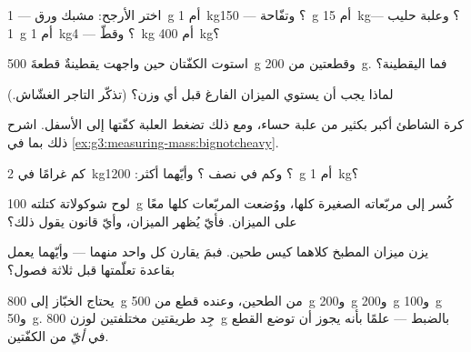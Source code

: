\begin{exercise}[$\star$]\label{exo:g3:measuring-mass:2}
اختر  الأرجح: مشبك ورق --- \qty{1}{g} أم \qty{1}{kg}؟
وتفّاحة --- \qty{150}{g} أم \qty{15}{kg}؟ وعلبة حليب ---
\qty{1}{g} أم \qty{1}{kg}؟ وقطّ --- \qty{4}{kg} أم \qty{400}{kg}؟
\end{exercise}

\begin{exercise}[$\star$]\label{exo:g3:measuring-mass:3}
استوت الكفّتان حين واجهت يقطينةٌ قطعةَ \qty{500}{g} وقطعتين من
\qty{200}{g}. فما  اليقطينة؟
\end{exercise}

\begin{exercise}[$\star$]\label{exo:g3:measuring-mass:4}
لماذا يجب أن يستوي الميزان الفارغ قبل أي وزن؟ (تذكّر التاجر
الغشّاش.)
\end{exercise}

\begin{exercise}[$\star$]\label{exo:g3:measuring-mass:5}
كرة الشاطئ أكبر بكثير من علبة حساء، ومع ذلك تضغط العلبة كفّتها
إلى الأسفل. اشرح ذلك بما في
\cref{ex:g3:measuring-mass:bignotcheavy}.
\end{exercise}

\begin{exercise}[$\star$]\label{exo:g3:measuring-mass:6}
كم غرامًا في \qty{2}{kg}؟ وكم في نصف ؟ وأيّهما أكثر:
\qty{1200}{g} أم \qty{1}{kg}؟
\end{exercise}

\begin{exercise}[$\star$]\label{exo:g3:measuring-mass:7}
لوح شوكولاتة كتلته \qty{100}{g} كُسر إلى مربّعاته الصغيرة كلها،
ووُضعت المربّعات كلها معًا على الميزان. فأيّ  يُظهر الميزان،
وأيّ قانون يقول ذلك؟
\end{exercise}

\begin{exercise}[$\star$]\label{exo:g3:measuring-mass:8}
يزن ميزان المطبخ  كلاهما كيس طحين. فبمَ يقارن كل
واحد منهما --- وأيّهما يعمل بقاعدة تعلّمتها قبل ثلاثة فصول؟
\end{exercise}

\begin{exercise}[$\star$]\label{exo:g3:measuring-mass:9}
يحتاج الخبّاز إلى \qty{800}{g} من الطحين، وعنده قطع من
\qty{500}{g} و\qty{200}{g} و\qty{200}{g} و\qty{100}{g}
و\qty{50}{g}. جِد طريقتين مختلفتين لوزن \qty{800}{g} بالضبط ---
علمًا بأنه يجوز أن توضع القطع في \emph{أيّ} من الكفّتين.
\end{exercise}

